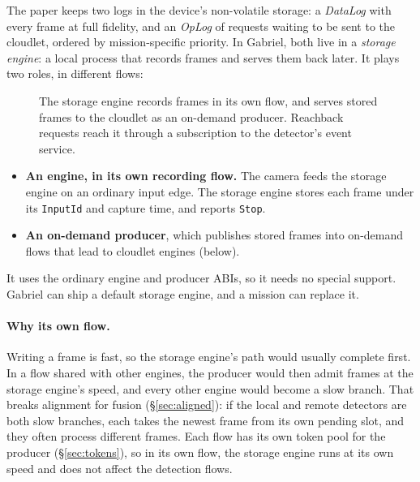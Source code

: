\documentclass[11pt]{article}
\newcommand{\code}[1]{\texttt{#1}}
\begin{document}
The paper keeps two logs in the device's non-volatile storage: a
\emph{DataLog} with every frame at full fidelity, and an \emph{OpLog} of
requests waiting to be sent to the cloudlet, ordered by mission-specific
priority. In Gabriel, both live in a \emph{storage engine}: a local process
that records frames and serves them back later. It plays two roles, in
different flows:

\begin{figure}[h]
\centering
{}
\caption{The storage engine records frames in its own flow, and serves stored
frames to the cloudlet as an on-demand producer. Reachback requests reach it
through a subscription to the detector's event service.}
\label{fig:storage}
\end{figure}

\begin{itemize}[nosep]
  \item \textbf{An engine, in its own recording flow.} The camera feeds the
        storage engine on an ordinary input edge. The storage engine stores
        each frame under its \code{InputId} and capture time, and reports
        \code{Stop}.
  \item \textbf{An on-demand producer}, which publishes stored frames into
        on-demand flows that lead to cloudlet engines (below).
\end{itemize}
It uses the ordinary engine and producer ABIs, so it needs no special support.
Gabriel can ship a default storage engine, and a mission can replace it.

\paragraph{Why its own flow.} Writing a frame is fast, so the storage engine's
path would usually complete first. In a flow shared with other engines, the
producer would then admit frames at the storage engine's speed, and every
other engine would become a slow branch. That breaks alignment for fusion
(\S\ref{sec:aligned}): if the local and remote detectors are both slow
branches, each takes the newest frame from its own pending slot, and they often
process different frames. Each flow has its own token pool for the producer
(\S\ref{sec:tokens}), so in its own flow, the storage engine runs at its own
speed and does not affect the detection flows.
\end{document}
